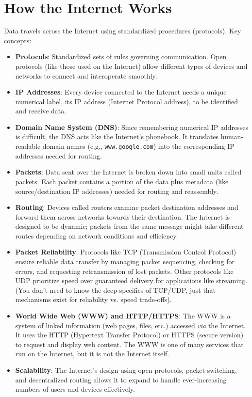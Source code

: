 \documentclass[11pt,oneside]{book}
\begin{document}
\section{How the Internet Works}
\label{sec:how_internet_works}
Data travels across the Internet using standardized procedures (protocols). Key concepts:
\begin{itemize}
    \item \textbf{Protocols}: Standardized sets of rules governing communication. Open protocols (like those used on the Internet) allow different types of devices and networks to connect and interoperate smoothly.
    \item \textbf{IP Addresses}: Every device connected to the Internet needs a unique numerical label, its IP address (Internet Protocol address), to be identified and receive data.
    \item \textbf{Domain Name System (DNS)}: Since remembering numerical IP addresses is difficult, the DNS acts like the Internet's phonebook. It translates human-readable domain names (e.g., \texttt{www.google.com}) into the corresponding IP addresses needed for routing.
    \item \textbf{Packets}: Data sent over the Internet is broken down into small units called packets. Each packet contains a portion of the data plus metadata (like source/destination IP addresses) needed for routing and reassembly.
    \item \textbf{Routing}: Devices called routers examine packet destination addresses and forward them across networks towards their destination. The Internet is designed to be dynamic; packets from the same message might take different routes depending on network conditions and efficiency.
    \item \textbf{Packet Reliability}: Protocols like TCP (Transmission Control Protocol) ensure reliable data transfer by managing packet sequencing, checking for errors, and requesting retransmission of lost packets. Other protocols like UDP prioritize speed over guaranteed delivery for applications like streaming. (You don't need to know the deep specifics of TCP/UDP, just that mechanisms exist for reliability vs. speed trade-offs).
    \item \textbf{World Wide Web (WWW) and HTTP/HTTPS}: The WWW is a system of linked information (web pages, files, etc.) accessed \textit{via} the Internet. It uses the HTTP (Hypertext Transfer Protocol) or HTTPS (secure version) to request and display web content. The WWW is one of many services that run on the Internet, but it is not the Internet itself.
    \item \textbf{Scalability}: The Internet's design using open protocols, packet switching, and decentralized routing allows it to expand to handle ever-increasing numbers of users and devices effectively.
\end{itemize}
\end{document}
